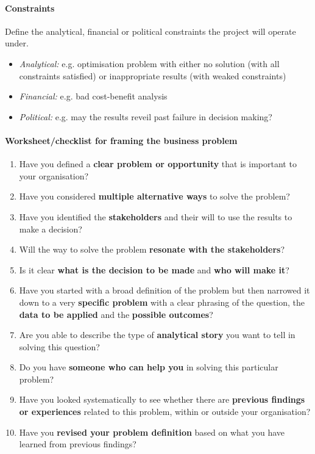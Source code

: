 \documentclass[a4paper, landscape, 6pt, fleqn]{scrartcl}
\renewcommand{\emph}[1]{\textbf{#1}}
\begin{document}
\begin{multicols*}{4}
\paragraph{Constraints}

Define the analytical, financial or political constraints the project will operate under.
\begin{itemize}
\item \textit{Analytical:} e.g. optimisation problem with either no solution (with all constraints satisfied) or inappropriate results (with weaked constraints)
\item \textit{Financial:} e.g. bad cost-benefit analysis
\item \textit{Political:} e.g. may the results reveil past failure in decision making?
\end{itemize}

\paragraph{Worksheet/checklist for framing the business problem}

\begin{enumerate}
\item Have you defined a \emph{clear problem or opportunity} that is important to your organisation?
\item Have you considered \emph{multiple alternative ways} to solve the problem?
\item Have you identified the \emph{stakeholders} and their will to use the results to make a decision?
\item Will the way to solve the problem \emph{resonate with the stakeholders}?
\item Is it clear \emph{what is the decision to be made} and \emph{who will make it}?
\item Have you started with a broad definition of the problem but then narrowed it down to a very \emph{specific problem} with a clear phrasing of the question, the \emph{data to be applied} and the \emph{possible outcomes}?
\item Are you able to describe the type of \emph{analytical story} you want to tell in solving this question?
\item Do you have \emph{someone who can help you} in solving this particular problem?
\item Have you looked systematically to see whether there are \emph{previous findings or experiences} related to this problem, within or outside your organisation?
\item Have you \emph{revised your problem definition} based on what you have learned from previous findings?
\end{enumerate}


\end{multicols*}
\end{document}
